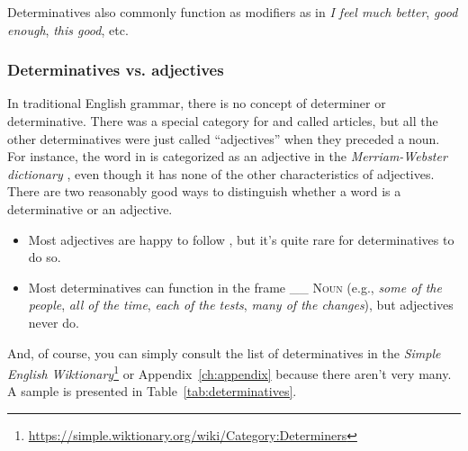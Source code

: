 Determinatives also commonly function as modifiers as in \textit{I feel \ob\emph{much} better{\cb}}, \ob\textit{good \emph{enough}{\cb}}, \textit{\ob\emph{this} good{\cb}}, etc.

\subsubsection*{Determinatives vs. adjectives}

In traditional English grammar, there is no concept of determiner or determinative. There was a special category for  and  called articles, but all the other determinatives were just called \enquote{adjectives} when they preceded a noun. For instance, the word  in  is categorized as an adjective in the \textit{Merriam-Webster dictionary} \citep{MerriamWebsterDictionary}, even though it has none of the other characteristics of adjectives. There are two reasonably good ways to distinguish whether a word is a determinative or an adjective.

\begin{itemize}[noitemsep]
    \item {}Most adjectives are happy to follow , but it's quite rare for determinatives to do so.
    \item {}Most determinatives can function in the frame \_\_  \textsc{Noun} (e.g., \textit{\emph{some} of the people}, \textit{\emph{all} of the time}, \textit{\emph{each} of the tests}, \textit{\emph{many} of the changes}), but adjectives never do.
\end{itemize}

And, of course, you can simply consult the list of determinatives in the \textit{Simple English Wiktionary}\footnote{\url{https://simple.wiktionary.org/wiki/Category:Determiners}} or Appendix~\ref{ch:appendix} because there aren't very many. A sample is presented in Table~\ref{tab:determinatives}.

